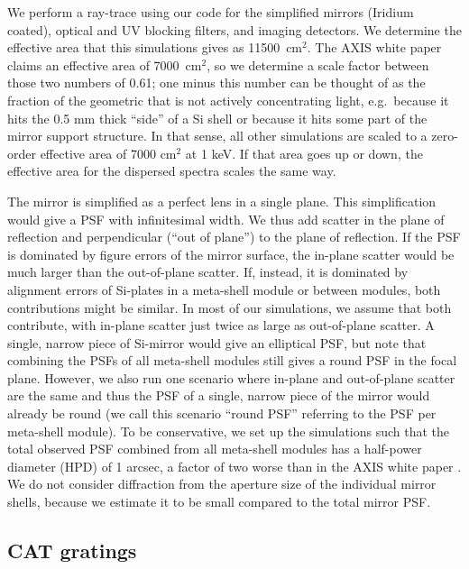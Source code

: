 \documentclass[12pt]{spieman}  %
\begin{document}
\begin{spacing}{1}
We perform a ray-trace using our code for the simplified mirrors (Iridium coated), optical and UV blocking filters, and imaging detectors. We determine the effective area that this simulations gives as 11500~cm$^2$. The AXIS white paper\cite{2019BAAS...51g.107M} claims an effective area of 7000~cm$^2$, so we determine a scale factor between those two numbers of 0.61; one minus this number can be thought of as the fraction of the geometric that is not actively concentrating light, e.g.\ because it hits the 0.5 mm thick ``side'' of a Si shell or because it hits some part of the mirror support structure.
In that sense, all other simulations are scaled to a zero-order effective area of 7000 cm$^2$ at 1 keV. If that area goes up or down, the effective area for the dispersed spectra scales the same way.


The mirror is simplified as a perfect lens in a single plane. This simplification would give a PSF with infinitesimal width. We thus add scatter in the plane of reflection and perpendicular (``out of plane'') to the plane of reflection. If the PSF is dominated by figure errors of the mirror surface, the in-plane scatter would be much larger than the out-of-plane scatter. If, instead, it is dominated by alignment errors of Si-plates in a meta-shell module or between modules, both contributions might be similar. In most of our simulations, we assume that both contribute, with in-plane scatter just twice as large as out-of-plane scatter. A single, narrow piece of Si-mirror would give an elliptical PSF, but note that combining the PSFs of all meta-shell modules still gives a round PSF in the focal plane.
However, we also run one scenario where in-plane and out-of-plane scatter are the same and thus the PSF of a single, narrow piece of the mirror would already be round (we call this scenario ``round PSF'' referring to the PSF per meta-shell module).
To be conservative, we set up the simulations such that the total observed PSF combined from all meta-shell modules has a half-power diameter (HPD) of 1 arcsec, a factor of two worse than in the AXIS white paper \cite{2019BAAS...51g.107M}.
We do not consider diffraction from the aperture size of the individual mirror shells, because we estimate it to be small compared to the total mirror PSF\cite{Chalifoux,Raimondi}.


\subsection{CAT gratings}


\end{spacing}
\end{document}

